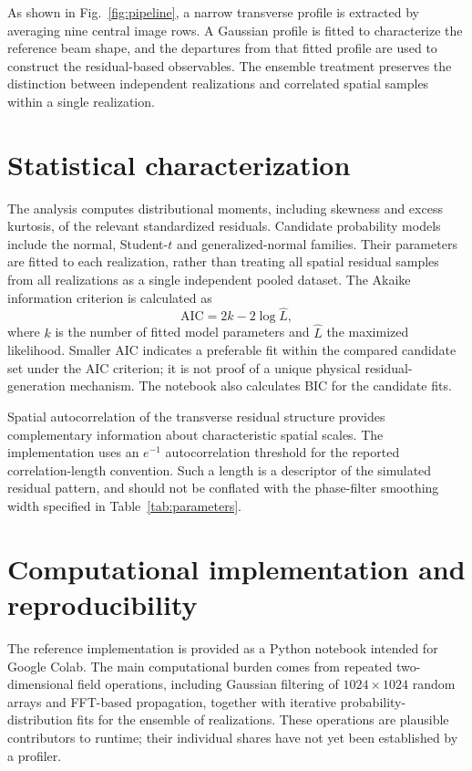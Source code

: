 \documentclass[11pt,a4paper]{article}
\begin{document}
As shown in Fig.~\ref{fig:pipeline}, a narrow transverse profile is extracted by averaging nine central image rows. A Gaussian profile is fitted to characterize the reference beam shape, and the departures from that fitted profile are used to construct the residual-based observables. The ensemble treatment preserves the distinction between independent realizations and correlated spatial samples within a single realization.

\section{Statistical characterization}
The analysis computes distributional moments, including skewness and excess kurtosis, of the relevant standardized residuals. Candidate probability models include the normal, Student-$t$ and generalized-normal families. Their parameters are fitted to each realization, rather than treating all spatial residual samples from all realizations as a single independent pooled dataset. The Akaike information criterion is calculated as
\begin{equation}
 \mathrm{AIC}=2k-2\log\widehat{L},
 \label{eq:aic}
\end{equation}
where $k$ is the number of fitted model parameters and $\widehat{L}$ the maximized likelihood. Smaller AIC indicates a preferable fit within the compared candidate set under the AIC criterion; it is not proof of a unique physical residual-generation mechanism. The notebook also calculates BIC for the candidate fits.

Spatial autocorrelation of the transverse residual structure provides complementary information about characteristic spatial scales. The implementation uses an $e^{-1}$ autocorrelation threshold for the reported correlation-length convention. Such a length is a descriptor of the simulated residual pattern, and should not be conflated with the phase-filter smoothing width specified in Table~\ref{tab:parameters}.

\section{Computational implementation and reproducibility}
The reference implementation is provided as a Python notebook intended for Google Colab. The main computational burden comes from repeated two-dimensional field operations, including Gaussian filtering of $1024\times1024$ random arrays and FFT-based propagation, together with iterative probability-distribution fits for the ensemble of realizations. These operations are plausible contributors to runtime; their individual shares have not yet been established by a profiler.
\end{document}
